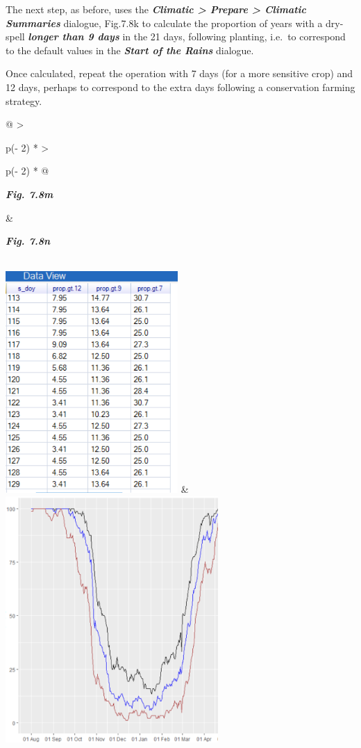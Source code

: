\documentclass[
  letterpaper,
  DIV=11,
  numbers=noendperiod]{scrreprt}
\begin{document}
The next step, as before, uses the \textbf{\emph{Climatic \textgreater{}
Prepare \textgreater{} Climatic Summaries}} dialogue, Fig.7.8k to
calculate the proportion of years with a dry-spell \textbf{\emph{longer
than 9 days}} in the 21 days, following planting, i.e.~to correspond to
the default values in the \textbf{\emph{Start of the Rains}} dialogue.

Once calculated, repeat the operation with 7 days (for a more sensitive
crop) and 12 days, perhaps to correspond to the extra days following a
conservation farming strategy.

\begin{longtable}[]{@{}
  >{\raggedright\arraybackslash}p{(\columnwidth - 2\tabcolsep) * }
  >{\raggedright\arraybackslash}p{(\columnwidth - 2\tabcolsep) * }@{}}
\toprule\noalign{}
\begin{minipage}[b]{\linewidth}\raggedright
\textbf{\emph{Fig. 7.8m}}
\end{minipage} & \begin{minipage}[b]{\linewidth}\raggedright
\textbf{\emph{Fig. 7.8n}}
\end{minipage} \\
\midrule\noalign{}
\endhead
\bottomrule\noalign{}
\endlastfoot
\includegraphics[width=2.58431in,height=3.32186in]{figures/Fig7.8m.png}
&
\includegraphics[width=3.18362in,height=3.68719in]{figures/Fig7.8n.png} \\
\end{longtable}
\end{document}

